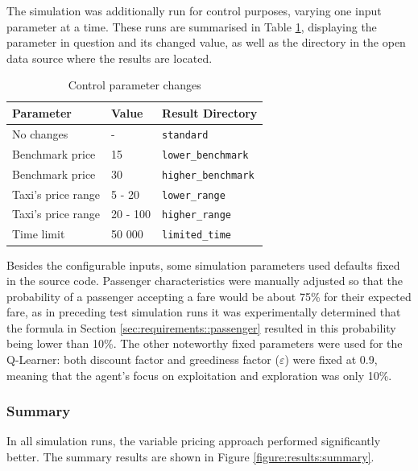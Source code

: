 The simulation was additionally run for control purposes, varying one input
parameter at a time. These runs are summarised in Table
\ref{table:inputs:control}, displaying the parameter in question and its
changed value, as well as the directory in the open data source where the
results are located.

\begin{table}
\begin{tabular}{ | l | l | l | }
  \hline
  Parameter & Value & Result Directory \\ \hline
  No changes & - & \texttt{standard} \\
  Benchmark price & 15 & \texttt{lower\_benchmark} \\
  Benchmark price & 30 & \texttt{higher\_benchmark} \\
  Taxi's price range & 5 - 20 & \texttt{lower\_range} \\
  Taxi's price range & 20 - 100 & \texttt{higher\_range} \\
  Time limit & 50 000 & \texttt{limited\_time} \\
  \hline
\end{tabular}
\caption{
  Control parameter changes
  \label{table:inputs:control}
}
\end{table}

Besides the configurable inputs, some simulation parameters used defaults
fixed in the source code. Passenger characteristics were manually adjusted so
that the probability of a passenger accepting a fare would be about 75\% for
their expected fare, as in preceding test simulation runs it was experimentally
determined that the formula in Section \ref{sec:requirements::passenger}
resulted in this probability being lower than 10\%. The other noteworthy fixed
parameters were used for the Q-Learner: both discount factor and greediness
factor ($\varepsilon$) were fixed at 0.9, meaning that the agent's focus on
exploitation and exploration was only 10\%.


\subsubsection{Summary}

In all simulation runs, the variable pricing approach performed significantly
better. The summary results are shown in Figure \ref{figure:results:summary}.

